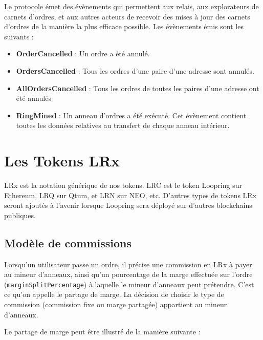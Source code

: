\documentclass[UTF8,nofonts]{article}
\makeatletter
\newenvironment{figurehere}
 {\def\@captype{figure}}
 {}
\makeatother
\begin{document}
\begin{multicols}{2}
Le protocole émet des évènements qui permettent aux relais, aux explorateurs de carnets d'ordres, et aux autres acteurs de recevoir des mises à jour des carnets d'ordres de la manière la plus efficace possible. Les évènements émis sont les suivants :

\begin{itemize}
	\item \textbf{OrderCancelled} : Un ordre a été annulé.
	\item \textbf{OrdersCancelled} : Tous les ordres d'une paire d'une adresse sont annulés.
	\item \textbf{AllOrdersCancelled} : Tous les ordres de toutes les paires d'une adresse ont été annulés
	\item \textbf{RingMined} : Un anneau d'ordres a été exécuté. Cet évènement contient toutes les données relatives au transfert de chaque anneau intérieur. 
\end{itemize}


\section{Les Tokens LRx \label{sec:token}}
LRx est la notation générique de nos tokens. LRC est le token Loopring sur Ethereum, LRQ sur Qtum, et LRN sur NEO, etc. D'autres types de tokens LRx seront ajoutés à l'avenir lorsque Loopring sera déployé sur d'autres blockchains publiques.

\subsection{Modèle de commissions\label{sec:fee_model}} 
Lorsqu'un utilisateur passe un ordre, il précise une commission en LRx à payer au mineur d'anneaux, ainsi qu'un pourcentage de la marge effectuée sur l'ordre (\verb|marginSplitPercentage|) à laquelle le mineur d'anneaux peut prétendre. C'est ce qu'on appelle le partage de marge. La décision de choisir le type de commission (commission fixe ou marge partagée) appartient au mineur d'anneaux.

Le partage de marge peut être illustré de la manière suivante :

\begin{center}
\begin{figurehere}
\centering
{}
\end{figurehere}
\end{center}
\end{multicols}
\end{document}
